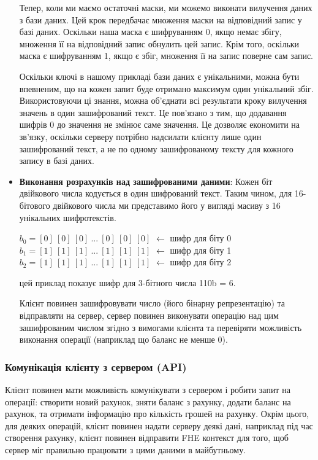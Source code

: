 \begin{itemize}
{Тепер, коли ми маємо остаточні маски, ми можемо виконати вилучення даних з бази даних. Цей крок
передбачає множення маски на відповідний запис у базі даних. Оскільки наша маска є шифруванням 0,
якщо немає збігу, множення її на відповідний запис обнулить цей запис. Крім того, оскільки маска
є шифруванням 1, якщо є збіг, множення її на запис поверне сам запис. 

Оскільки ключі в нашому прикладі бази даних є унікальними, можна бути впевненим, що на кожен
запит буде отримано максимум один унікальний збіг. Використовуючи ці знання, можна об'єднати всі
результати кроку вилучення значень в один зашифрований текст. Це пов'язано з тим, що додавання
шифрів 0 до значення не змінює саме значення. Це дозволяє економити на зв'язку, оскільки серверу
потрібно надсилати клієнту лише один зашифрований текст, а не по одному зашифрованому тексту для
кожного запису в базі даних.

}
    \item{\textbf{Виконання розрахунків над зашифрованими даними}:
Кожен біт двійкового числа кодується в один шифрований текст. Таким чином, для 16-бітового
двійкового числа ми представимо його у вигляді масиву з 16 унікальних шифротекстів.

\begin{centering}
    \(b_0 = [0]\ [0]\ [0]\ ...\ [0]\ [0]\ [0]\)     \(\leftarrow\) шифр для біту 0\\
    \(b_1 = [1]\ [1]\ [1]\ ...\ [1]\ [1]\ [1]\)     \(\leftarrow\) шифр для біту 1\\
    \(b_2 = [1]\ [1]\ [1]\ ...\ [1]\ [1]\ [1]\)     \(\leftarrow\) шифр для біту 2\\
\end{centering}
 цей приклад показує шифр для 3-бітного числа 110b = 6.

 Клієнт повинен зашифровувати число (його бінарну репрезентацію) та відправляти на сервер,
 сервер повинен виконувати операцію над цим зашифрованим числом згідно з вимогами клієнта та
 перевіряти можливість виконання операції (наприклад що баланс не менше 0).
}
\end{itemize}


\subsubsection*{Комунікація клієнту з сервером (API)}
Клієнт повинен мати можливість комунікувати з сервером і робити запит на операції: створити
новий рахунок, зняти баланс з рахунку, додати баланс на рахунок, та отримати інформацію
про кількість грошей на рахунку. Окрім цього, для деяких операцій, клієнт повинен надати
серверу деякі дані, наприклад під час створення рахунку, клієнт повинен відправити FHE контекст
для того, щоб сервер міг правильно працювати з цими даними в майбутньому.

